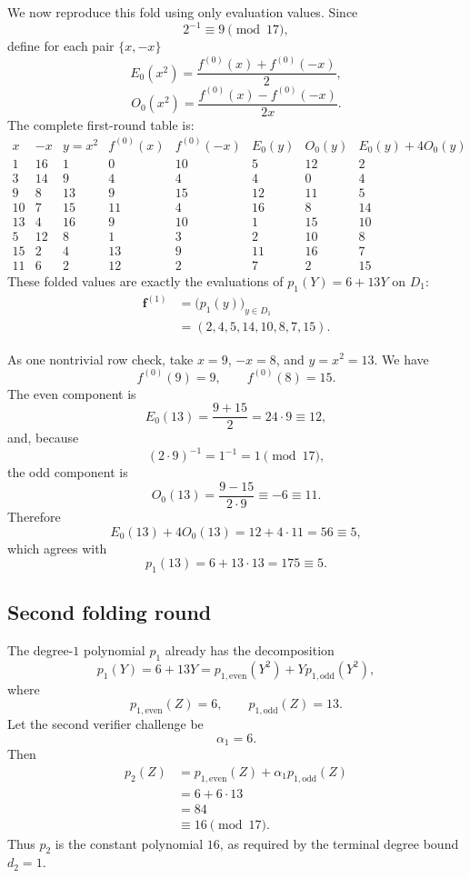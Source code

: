 We now reproduce this fold using only evaluation values. Since
\[
    2^{-1}\equiv9\pmod{17},
\]
define for each pair $\{x,-x\}$
\[
    E_0(x^2)=\frac{f^{(0)}(x)+f^{(0)}(-x)}2,
\]
\[
    O_0(x^2)=\frac{f^{(0)}(x)-f^{(0)}(-x)}{2x}.
\]
The complete first-round table is:
\[
\begin{array}{c|c|c|c|c|c|c|c}
x & -x & y=x^2
& f^{(0)}(x) & f^{(0)}(-x)
& E_0(y) & O_0(y) & E_0(y)+4O_0(y)\\
\hline
1  &16&1 &0 &10&5 &12&2\\
3  &14&9 &4 &4 &4 &0 &4\\
9  &8 &13&9 &15&12&11&5\\
10 &7 &15&11&4 &16&8 &14\\
13 &4 &16&9 &10&1 &15&10\\
5  &12&8 &1 &3 &2 &10&8\\
15 &2 &4 &13&9 &11&16&7\\
11 &6 &2 &12&2 &7 &2 &15
\end{array}
\]
These folded values are exactly the evaluations of $p_1(Y)=6+13Y$ on $D_1$:
\[
\begin{aligned}
\mathbf f^{(1)}
&=\bigl(p_1(y)\bigr)_{y\in D_1}\\
&=(2,4,5,14,10,8,7,15).
\end{aligned}
\]

As one nontrivial row check, take $x=9$, $-x=8$, and $y=x^2=13$. We have
\[
    f^{(0)}(9)=9,
    \qquad
    f^{(0)}(8)=15.
\]
The even component is
\[
    E_0(13)=\frac{9+15}{2}=24\cdot9\equiv12,
\]
and, because
\[
    (2\cdot9)^{-1}=1^{-1}=1\pmod{17},
\]
the odd component is
\[
    O_0(13)=\frac{9-15}{2\cdot9}\equiv -6\equiv11.
\]
Therefore
\[
    E_0(13)+4O_0(13)=12+4\cdot11=56\equiv5,
\]
which agrees with
\[
    p_1(13)=6+13\cdot13=175\equiv5.
\]

\subsection{Second folding round}

The degree-$1$ polynomial $p_1$ already has the decomposition
\[
    p_1(Y)=6+13Y
          =p_{1,\mathrm{even}}(Y^2)
           +Yp_{1,\mathrm{odd}}(Y^2),
\]
where
\[
    p_{1,\mathrm{even}}(Z)=6,
    \qquad
    p_{1,\mathrm{odd}}(Z)=13.
\]
Let the second verifier challenge be
\[
    \alpha_1=6.
\]
Then
\[
\begin{aligned}
p_2(Z)
&=p_{1,\mathrm{even}}(Z)+\alpha_1p_{1,\mathrm{odd}}(Z)\\
&=6+6\cdot13\\
&=84\\
&\equiv16\pmod{17}.
\end{aligned}
\]
Thus $p_2$ is the constant polynomial $16$, as required by the terminal degree bound
$d_2=1$.

